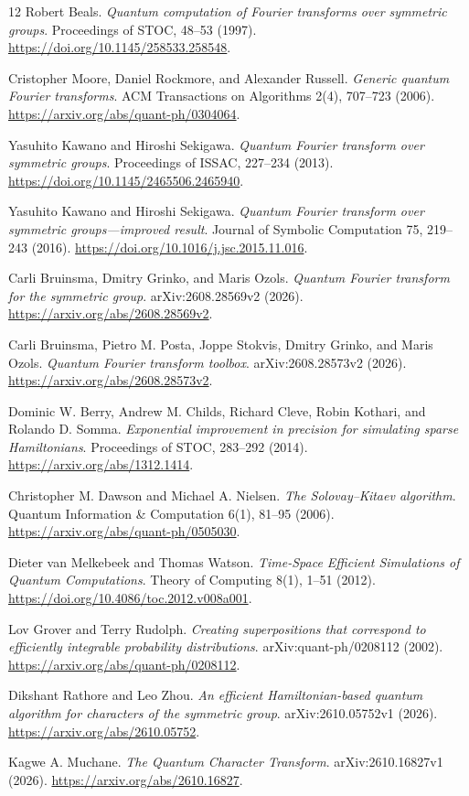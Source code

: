 \documentclass[11pt]{article}
\theoremstyle{definition}
\begin{document}
\begingroup
\small
\setlength{\parskip}{0pt}
\begin{thebibliography}{12}
\setlength{\itemsep}{4pt}
Robert Beals.
\emph{Quantum computation of Fourier transforms over symmetric groups}.
Proceedings of STOC, 48--53 (1997).
\url{https://doi.org/10.1145/258533.258548}.

Cristopher Moore, Daniel Rockmore, and Alexander Russell.
\emph{Generic quantum Fourier transforms}.
ACM Transactions on Algorithms 2(4), 707--723 (2006).
\url{https://arxiv.org/abs/quant-ph/0304064}.

Yasuhito Kawano and Hiroshi Sekigawa.
\emph{Quantum Fourier transform over symmetric groups}.
Proceedings of ISSAC, 227--234 (2013).
\url{https://doi.org/10.1145/2465506.2465940}.

Yasuhito Kawano and Hiroshi Sekigawa.
\emph{Quantum Fourier transform over symmetric groups---improved result}.
Journal of Symbolic Computation 75, 219--243 (2016).
\url{https://doi.org/10.1016/j.jsc.2015.11.016}.

Carli Bruinsma, Dmitry Grinko, and Maris Ozols.
\emph{Quantum Fourier transform for the symmetric group}.
arXiv:2608.28569v2 (2026).
\url{https://arxiv.org/abs/2608.28569v2}.

Carli Bruinsma, Pietro M. Posta, Joppe Stokvis, Dmitry Grinko, and Maris Ozols.
\emph{Quantum Fourier transform toolbox}.
arXiv:2608.28573v2 (2026).
\url{https://arxiv.org/abs/2608.28573v2}.

Dominic W. Berry, Andrew M. Childs, Richard Cleve, Robin Kothari, and
Rolando D. Somma.
\emph{Exponential improvement in precision for simulating sparse Hamiltonians}.
Proceedings of STOC, 283--292 (2014).
\url{https://arxiv.org/abs/1312.1414}.

Christopher M. Dawson and Michael A. Nielsen.
\emph{The Solovay--Kitaev algorithm}.
Quantum Information \& Computation 6(1), 81--95 (2006).
\url{https://arxiv.org/abs/quant-ph/0505030}.

Dieter van Melkebeek and Thomas Watson.
\emph{Time-Space Efficient Simulations of Quantum Computations}.
Theory of Computing 8(1), 1--51 (2012).
\url{https://doi.org/10.4086/toc.2012.v008a001}.

Lov Grover and Terry Rudolph.
\emph{Creating superpositions that correspond to efficiently integrable
probability distributions}.
arXiv:quant-ph/0208112 (2002).
\url{https://arxiv.org/abs/quant-ph/0208112}.

Dikshant Rathore and Leo Zhou.
\emph{An efficient Hamiltonian-based quantum algorithm for characters
of the symmetric group}.
arXiv:2610.05752v1 (2026).
\url{https://arxiv.org/abs/2610.05752}.

Kagwe A. Muchane.
\emph{The Quantum Character Transform}.
arXiv:2610.16827v1 (2026).
\url{https://arxiv.org/abs/2610.16827}.
\end{thebibliography}
\endgroup
\end{document}
